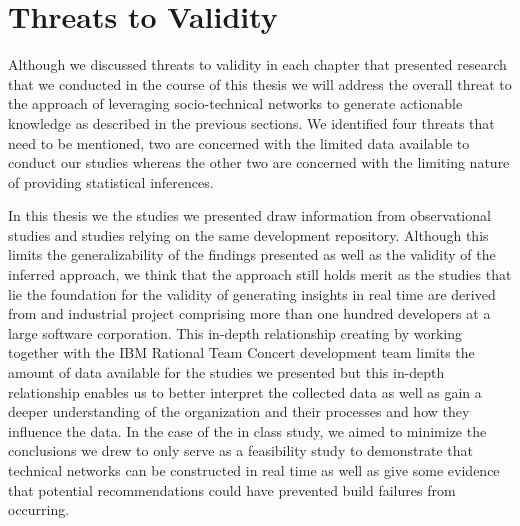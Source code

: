 %

\section{Threats to Validity}
Although we discussed threats to validity in each chapter that presented research that we conducted in the course of this thesis we will address the overall threat to the approach of leveraging socio-technical networks to generate actionable knowledge as described in the previous sections.
We identified four threats that need to be mentioned, two are concerned with the limited data available to conduct our studies whereas the other two are concerned with the limiting nature of providing statistical inferences.

In this thesis we the studies we presented draw information from observational studies and studies relying on the same development repository.
Although this limits the generalizability of the findings presented as well as the validity of the inferred approach, we think that the approach still holds merit as the studies that lie the foundation for the validity of generating insights in real time are derived from and industrial project comprising more than one hundred developers at a large software corporation.
This in-depth relationship creating by working together with the IBM Rational Team Concert development team limits the amount of data available for the studies we presented but this in-depth relationship enables us to better interpret the collected data as well as gain a deeper understanding of the organization and their processes and how they influence the data.
In the case of the in class study, we aimed to minimize the conclusions we drew to only serve as a feasibility study to demonstrate that technical networks can be constructed in real time as well as give some evidence that potential recommendations could have prevented build failures from occurring.

